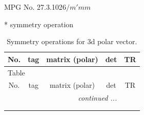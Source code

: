 \documentclass[fleqn,8pt]{jsarticle}
\begin{document}
\setcounter{MaxMatrixCols}{32}

\renewcommand{\tablename}{Table~}
\renewcommand{\figurename}{Figure~}
\begin{center}
\LARGE
MPG No. 27.3.102\quad$6/m'mm$
\end{center}
* symmetry operation
\renewcommand{\arraystretch}{1.3}
\begin{longtable}{ccccc}
\caption{Symmetry operations for 3d polar vector.}
 \\
 \hline \hline
No. & tag & matrix (polar) & det & TR \\ \hline \endfirsthead

\multicolumn{4}{l}{\tablename\ \thetable{}} \\
 \hline \hline
No. & tag & matrix (polar) & det & TR \\ \hline \endhead

 \hline \hline
\multicolumn{4}{r}{\footnotesize\it continued ...} \\ \endfoot

 \hline \hline
\multicolumn{4}{r}{} \\ \endlastfoot


\end{longtable}
\end{document}

